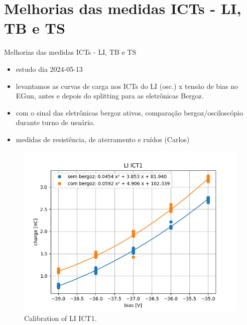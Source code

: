 \section{Melhorias das medidas ICTs - LI, TB e TS}



\begin{frame}{Melhorias das medidas ICTs - LI, TB e TS}

{\footnotesize
\begin{itemize}
    \item estudo dia 2024-05-13
    \item levantamos as curvas de carga nos ICTs do LI (osc.) x tensão de bias no EGun, antes e depois do splitting para as eletrônicas Bergoz.
    \item com o sinal das eletrônicas bergoz ativos, comparação bergoz/osciloscópio durante turno de usuário.
    \item medidas de resistência, de aterramento e ruídos (Carlos)
\end{itemize}
}
\begin{figure}[ht]
    \begin{minipage}[b]{0.4\linewidth}
        \centering
        \includegraphics[width=\textwidth]{2024-07-12/figures/li-ict1.png}
        \caption{Calibration of LI ICT1.}
        \label{fig:a}
    \end{minipage}
    \hspace{0.2cm}
    \begin{minipage}[b]{0.4\linewidth}

\end{minipage}
\end{figure}
\end{frame}
